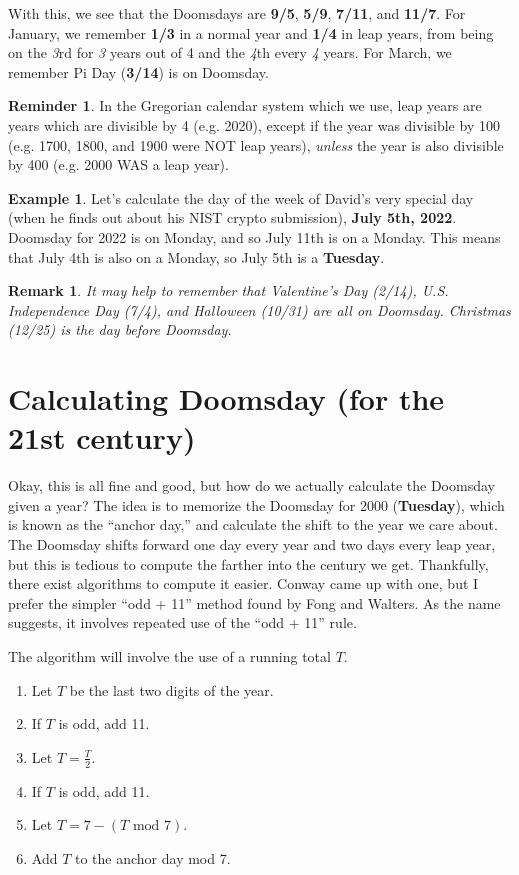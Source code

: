 \documentclass[12pt,letterpaper]{article}
\theoremstyle{plain}
\newtheorem*{remark}{Remark}
\theoremstyle{definition}
\newtheorem{example}{Example}
\newtheorem*{reminder}{Reminder}
\begin{document}
With this, we see that the Doomsdays are \textbf{9/5}, \textbf{5/9}, \textbf{7/11}, and \textbf{11/7}. For January, we remember \textbf{1/3} in a normal year and \textbf{1/4} in leap years, from being on the \textit 3rd for \textit{3} years out of 4 and the \textit 4th every \textit 4 years. For March, we remember Pi Day (\textbf{3/14}) is on Doomsday. 

\begin{reminder}\label{rem:leapyear}
	In the Gregorian calendar system which we use, leap years are years which are divisible by 4 (e.g. 2020), except if the year was divisible by 100 (e.g. 1700, 1800, and 1900 were NOT leap years), \textit{unless} the year is also divisible by 400 (e.g. 2000 WAS a leap year). 
\end{reminder}

\begin{example}
	Let's calculate the day of the week of David's very special day (when he finds out about his NIST crypto submission), \textbf{July 5th, 2022}. Doomsday for 2022 is on Monday, and so July 11th is on a Monday. This means that July 4th is also on a Monday, so July 5th is a \textbf{Tuesday}.
\end{example} 

\begin{remark}
	It may help to remember that Valentine's Day (2/14), U.S. Independence Day (7/4), and Halloween (10/31) are all on Doomsday. Christmas (12/25) is the day before Doomsday. 
\end{remark}

\section{Calculating Doomsday (for the 21st century)}

Okay, this is all fine and good, but how do we actually calculate the Doomsday given a year? The idea is to memorize the Doomsday for 2000 (\textbf{Tuesday}), which is known as the ``anchor day,'' and calculate the shift to the year we care about. The Doomsday shifts forward one day every year and two days every leap year, but this is tedious to compute the farther into the century we get. Thankfully, there exist algorithms to compute it easier. Conway came up with one, but I prefer the simpler ``odd + 11'' method found by Fong and Walters. As the name suggests, it involves repeated use of the ``odd + 11'' rule. 

The algorithm will involve the use of a running total \(T\). 
\begin{enumerate}
	\item Let \(T\) be the last two digits of the year. 
	\item If \(T\) is odd, add 11. 
	\item Let \(T=\frac{T}{2}\). 
	\item If \(T\) is odd, add 11. 
	\item Let \(T=7-(T\text{ mod } 7)\). 
	\item Add \(T\) to the anchor day mod 7. 
\end{enumerate}
\end{document}
